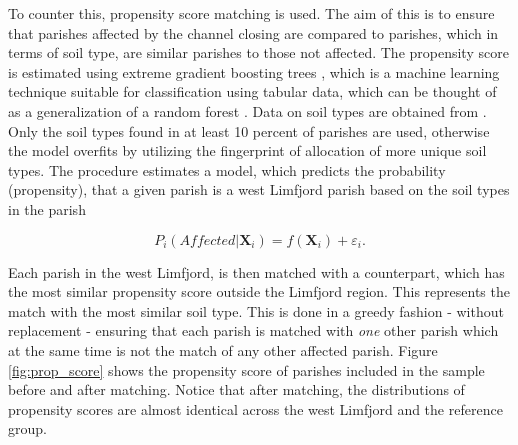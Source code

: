 \documentclass[11pt]{article}
\begin{document}
To counter this, propensity score matching is used. The aim of this is to ensure that parishes affected by the channel closing are compared to parishes, which in terms of soil type, are similar parishes to those not affected. The propensity score is estimated using extreme gradient boosting trees \citep{chen2016xgboost}, which is a machine learning technique suitable for classification using tabular data, which can be thought of as a generalization of a random forest \citep{Breiman2001}. Data on soil types are obtained from \cite{Pedersen2019}. Only the soil types found in at least 10 percent of parishes are used, otherwise the model overfits by utilizing the fingerprint of allocation of more unique soil types. The procedure estimates a model, which predicts the probability (propensity), that a given parish is a west Limfjord parish based on the soil types in the parish

\begin{equation}
\label{eq:eq7_5}
P_i(Affected|\mathbf{X}_i) = f(\mathbf{X}_i)+\varepsilon_i.
\end{equation}

Each parish in the west Limfjord, is then matched with a counterpart, which has the most similar propensity score outside the Limfjord region. This represents the match with the most similar soil type. This is done in a greedy fashion - without replacement - ensuring that each parish is matched with \textit{one} other parish which at the same time is not the match of any other affected parish. Figure \ref{fig:prop_score} shows the propensity score of parishes included in the sample before and after matching. Notice that after matching, the distributions of propensity scores are almost identical across the west Limfjord and the reference group. 
\end{document}
